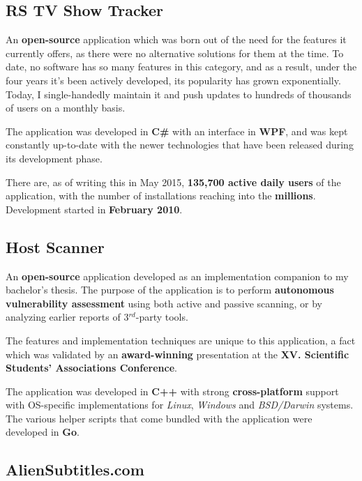 \documentclass[11pt,a4paper,sans]{moderncv}
\begin{document}
	\subsection{RS TV Show Tracker}

		An \textbf{open-source} application which was born out of the need for the features it currently offers, as there were no alternative solutions for them at the time. To date, no software has so many features in this category, and as a result, under the four years it's been actively developed, its popularity has grown exponentially. Today, I single-handedly maintain it and push updates to hundreds of thousands of users on a monthly basis.
		
		The application was developed in \textbf{C\#} with an interface in \textbf{WPF}, and was kept constantly up-to-date with the newer technologies that have been released during its development phase.

		There are, as of writing this in May 2015, \textbf{135,700 active daily users} of the application, with the number of installations reaching into the \textbf{millions}. Development started in \textbf{February 2010}.

	\subsection{Host Scanner}

		An \textbf{open-source} application developed as an implementation companion to my bachelor's thesis. The purpose of the application is to perform \textbf{autonomous vulnerability assessment} using both active and passive scanning, or by analyzing earlier reports of 3$^{rd}$-party tools.
		
		The features and implementation techniques are unique to this application, a fact which was validated by an \textbf{award-winning} presentation at the \textbf{XV. Scientific Students' Associations Conference}.
		
		The application was developed in \textbf{C++} with strong \textbf{cross-platform} support with OS-specific implementations for \textit{Linux}, \textit{Windows} and \textit{BSD/Darwin} systems. The various helper scripts that come bundled with the application were developed in \textbf{Go}.

	\subsection{AlienSubtitles.com}
\end{document}
